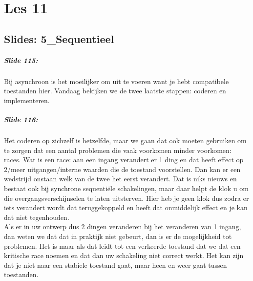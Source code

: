 \documentclass[10pt,a4paper]{book}
\begin{document}
\chapter{Les 11}

\section{Slides: 5\_Sequentieel}

\paragraph{Slide 115:} Bij asynchroon is het moeilijker om uit te voeren want je hebt compatibele toestanden hier. Vandaag bekijken we de twee laatste stappen: coderen en implementeren.

\paragraph{Slide 116:} Het coderen op zichzelf is hetzelfde, maar we gaan dat ook moeten gebruiken om te zorgen dat een aantal problemen die vaak voorkomen minder voorkomen: races. Wat is een race: aan een ingang verandert er 1 ding en dat heeft effect op 2/meer uitgangen/interne waarden die de toestand voorstellen. Dan kan er een wedstrijd onstaan welk van de twee het eerst verandert. Dat is niks nieuws en bestaat ook bij synchrone sequenti\"ele schakelingen, maar daar helpt de klok u om die overgangsverschijnselen te laten uitsterven. Hier heb je geen klok dus zodra er iets verandert wordt dat teruggekoppeld en heeft dat onmiddelijk effect en je kan dat niet tegenhouden.\\
Als er in uw ontwerp dus 2 dingen veranderen bij het veranderen van 1 ingang, dan weten we dat dat in praktijk niet gebeurt, dan is er de mogelijkheid tot problemen. Het is maar als dat leidt tot een verkeerde toestand dat we dat een kritische race noemen en dat dan uw schakeling niet correct werkt. Het kan zijn dat je niet naar een stabiele toestand gaat, maar heen en weer gaat tussen toestanden.
\end{document}
